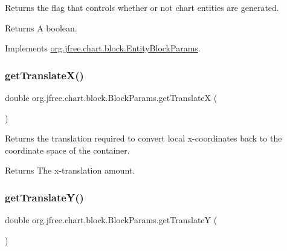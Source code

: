 Returns the flag that controls whether or not chart entities are generated.

\begin{DoxyReturn}{Returns}
A boolean. 
\end{DoxyReturn}


Implements \mbox{\hyperlink{interfaceorg_1_1jfree_1_1chart_1_1block_1_1_entity_block_params_ad7adae21d0a6b47d5319b310fc515f00}{org.\+jfree.\+chart.\+block.\+Entity\+Block\+Params}}.

\mbox{\label{classorg_1_1jfree_1_1chart_1_1block_1_1_block_params_aad14cc6a094bce857c9959fee9e2efe6}} 
\subsubsection{\texorpdfstring{get\+Translate\+X()}{getTranslateX()}}
{\footnotesize\ttfamily double org.\+jfree.\+chart.\+block.\+Block\+Params.\+get\+TranslateX (\begin{DoxyParamCaption}{ }\end{DoxyParamCaption})}

Returns the translation required to convert local x-\/coordinates back to the coordinate space of the container.

\begin{DoxyReturn}{Returns}
The x-\/translation amount. 
\end{DoxyReturn}
\mbox{\label{classorg_1_1jfree_1_1chart_1_1block_1_1_block_params_a7bee0137374f607f203c0a20d2c35ff7}} 
\subsubsection{\texorpdfstring{get\+Translate\+Y()}{getTranslateY()}}
{\footnotesize\ttfamily double org.\+jfree.\+chart.\+block.\+Block\+Params.\+get\+TranslateY (\begin{DoxyParamCaption}{ }\end{DoxyParamCaption})}

